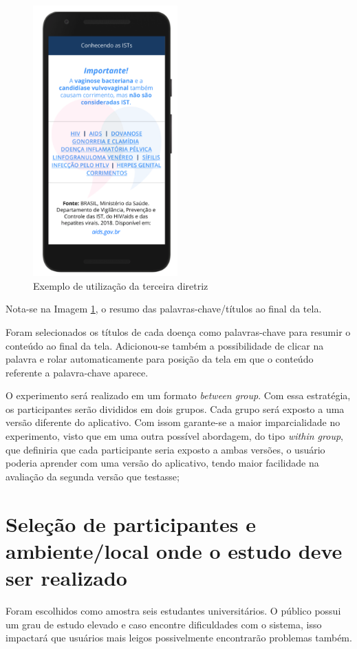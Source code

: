 \documentclass[12pt]{article}
\begin{document}
\begin{figure}[H]
  \centering
  \includegraphics[width=15em]{images/image_3.png}
  \caption{Exemplo de utilização da terceira diretriz}
  \label{fig:img3}
\end{figure}

Nota-se na Imagem \ref{fig:img3}, o resumo das palavras-chave/títulos ao final da tela.

Foram selecionados os títulos de cada doença como palavras-chave para resumir o conteúdo ao final da tela. Adicionou-se também a possibilidade de clicar na palavra e rolar automaticamente para posição da tela em que o conteúdo referente a palavra-chave aparece.

O experimento será realizado em um formato \textit{between group}. Com essa estratégia, os participantes serão divididos em dois grupos. Cada grupo será exposto a uma versão diferente do aplicativo. Com issom garante-se a maior imparcialidade no experimento, visto que em uma outra possível abordagem, do tipo \textit{within group}, que definiria que cada participante seria exposto a ambas versões, o usuário poderia aprender com uma versão do aplicativo, tendo maior facilidade na avaliação da segunda versão que testasse;

\section{Seleção de participantes e ambiente/local onde o estudo deve ser realizado}

Foram escolhidos como amostra seis estudantes universitários. O público possui um grau de estudo elevado e caso encontre dificuldades com o sistema, isso impactará que usuários mais leigos possivelmente encontrarão problemas também. 
\end{document}
